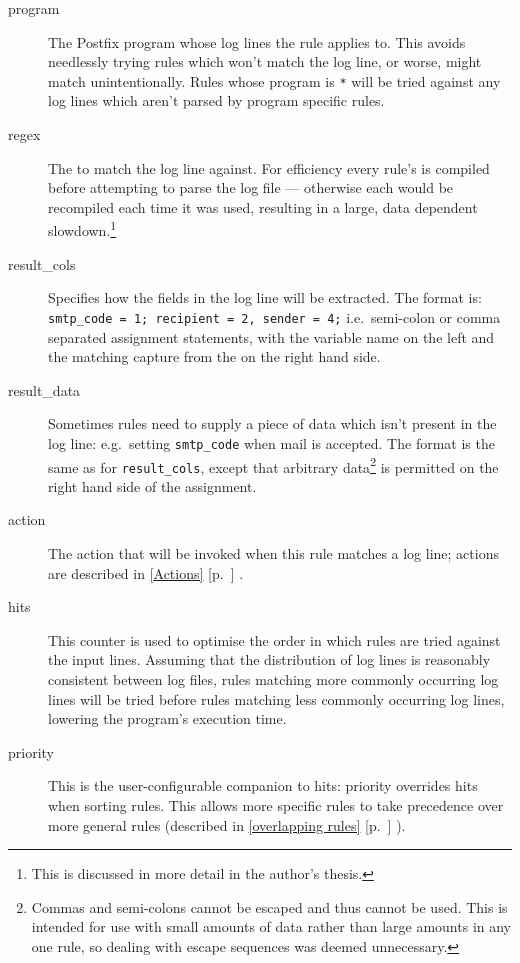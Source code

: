 \documentclass[draft]{svmult}
\newcommand{\refwithpage}[1]{%
    \empty{}\ref{#1} [p.~\pageref{#1}]%
}
\newcommand{\sectionref}[1]{%
    \textsection{}\refwithpage{#1}%
}
\newcommand{\tab}[0]{%
    \hspace*{2em}%
}
\begin{document}
\begin{description}

    \item [program] The Postfix program whose log lines the rule applies
        to.  This avoids needlessly trying rules which won't match the log
        line, or worse, might match unintentionally.  Rules whose program
        is \texttt{*} will be tried against any log lines which aren't
        parsed by program specific rules.

    \item [regex] The \regex{} to match the log line against.  For
        efficiency every rule's \regex{} is compiled before attempting to
        parse the log file --- otherwise each \regex{} would be recompiled
        each time it was used, resulting in a large, data dependent
        slowdown.\footnote{This is discussed in more detail in the author's
        thesis.}

    \item [result\_cols] Specifies how the fields in the
        log line will be extracted.  The format is:
        \tab{} \texttt{smtp\_code = 1; recipient = 2, sender = 4;}
        \newline i.e.\ semi-colon or comma separated assignment statements,
        with the variable name on the left and the matching capture from
        the \regex{} on the right hand side.

    \item [result\_data] Sometimes rules need to supply a piece of data
        which isn't present in the log line: e.g.\ setting
        \texttt{smtp\_code} when mail is accepted.  The format is the same
        as for \texttt{result\_cols}, except that arbitrary
        data\footnote{Commas and semi-colons cannot be escaped and thus
        cannot be used.  This is intended for use with small amounts of
        data rather than large amounts in any one rule, so dealing with
        escape sequences was deemed unnecessary.} is permitted on the right
        hand side of the assignment.

    \item [action] The action that will be invoked when this rule matches a
        log line; actions are described in \sectionref{Actions}.

    \item [hits] This counter is used to optimise the order in which rules
        are tried against the input lines.  Assuming that the distribution
        of log lines is reasonably consistent between log files, rules
        matching more commonly occurring log lines will be tried before
        rules matching less commonly occurring log lines, lowering the
        program's execution time.

    \item [priority] This is the user-configurable companion to hits:
        priority overrides hits when sorting rules.  This allows more
        specific rules to take precedence over more general rules
        (described in \sectionref{overlapping rules}).

\end{description}
\end{document}
